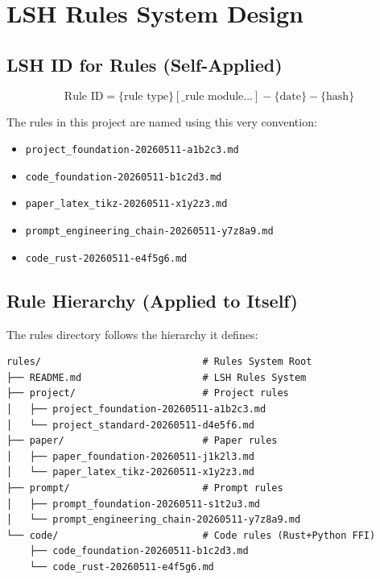 \documentclass{article}
\begin{document}
\section{LSH Rules System Design}

\subsection{LSH ID for Rules (Self-Applied)}

\begin{equation}
\label{eq:rules-id}
\text{Rule ID} = \{\text{rule type}\}[\text{\_rule module...}]-\{\text{date}\}-\{\text{hash}\}
\end{equation}

The rules in this project are named using this very convention:
\begin{itemize}
    \item \texttt{project\_foundation-20260511-a1b2c3.md}
    \item \texttt{code\_foundation-20260511-b1c2d3.md}
    \item \texttt{paper\_latex\_tikz-20260511-x1y2z3.md}
    \item \texttt{prompt\_engineering\_chain-20260511-y7z8a9.md}
    \item \texttt{code\_rust-20260511-e4f5g6.md}
\end{itemize}

\subsection{Rule Hierarchy (Applied to Itself)}

The rules directory follows the hierarchy it defines:

\begin{lstlisting}[caption={rules/ directory structure}]
rules/                            # Rules System Root
├── README.md                     # LSH Rules System
├── project/                      # Project rules
│   ├── project_foundation-20260511-a1b2c3.md
│   └── project_standard-20260511-d4e5f6.md
├── paper/                        # Paper rules
│   ├── paper_foundation-20260511-j1k2l3.md
│   └── paper_latex_tikz-20260511-x1y2z3.md
├── prompt/                       # Prompt rules
│   ├── prompt_foundation-20260511-s1t2u3.md
│   └── prompt_engineering_chain-20260511-y7z8a9.md
└── code/                         # Code rules (Rust+Python FFI)
    ├── code_foundation-20260511-b1c2d3.md
    └── code_rust-20260511-e4f5g6.md
\end{lstlisting}
\end{document}
